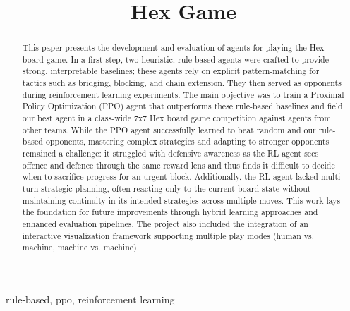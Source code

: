 \documentclass[conference]{IEEEtran}
\begin{document}
\title{Hex Game\\
}

\author{
\and
{}
}

\maketitle

\begin{abstract}
This paper presents the development and evaluation of agents for playing the Hex board game. In a first step,  two heuristic, rule-based agents were crafted to provide strong, interpretable baselines; these agents rely on explicit pattern-matching for tactics such as bridging, blocking, and chain extension. They then served as opponents during reinforcement learning experiments. The main objective was to train a Proximal Policy Optimization (PPO) agent that outperforms these rule-based baselines and field our best agent in a class-wide 7x7 Hex board game competition against agents from other teams. While the PPO agent successfully learned to beat random and our rule-based opponents, mastering complex strategies and adapting to stronger opponents remained a challenge: it struggled with defensive awareness as the RL agent sees offence and defence through the same reward lens and thus finds it difficult to decide when to sacrifice progress for an urgent block. Additionally, the RL agent lacked multi-turn strategic planning, often reacting only to the current board state without maintaining continuity in its intended strategies across multiple moves. This work lays the foundation for future improvements through hybrid learning approaches and enhanced evaluation pipelines. The project also included the integration of an interactive visualization framework supporting multiple play modes (human vs. machine, machine vs. machine). 
\end{abstract}

\begin{IEEEkeywords}
rule-based, ppo, reinforcement learning
\end{IEEEkeywords}
\end{document}
